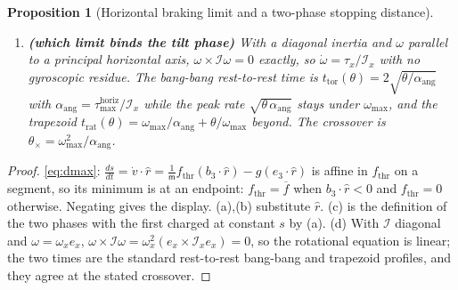 \documentclass[11pt]{article}
\theoremstyle{plain}
\newtheorem{proposition}[theorem]{Proposition}
\theoremstyle{definition}
\theoremstyle{remark}
\newcommand{\mass}{\mathsf m}
\newcommand{\inertia}{\mathcal I}
\begin{document}
\begin{proposition}[Horizontal braking limit and a two-phase stopping distance]
\begin{enumerate}[label=(\alph*)]
\begin{equation}
  \;+\;\frac{s^2}{2\,a_{\max}(\theta)}\Big],
  \end{equation}
  a lower bound on the true stopping distance, since $a_{\max}$ does not subtract the thrust
  spent holding altitude. The two terms move oppositely in $\theta$, so the minimiser is
  interior.
  \item \textbf{(which limit binds the tilt phase)} With a diagonal inertia and $\omega$ parallel
  to a principal horizontal axis, $\omega\times\inertia\omega=0$ exactly, so
  $\dot\omega=\tau_x/\inertia_x$ with no gyroscopic residue. The bang-bang rest-to-rest time is
  $t_{\mathrm{tor}}(\theta)=2\sqrt{\theta/\alpha_{\mathrm{ang}}}$ with
  $\alpha_{\mathrm{ang}}=\tau^{\mathrm{horiz}}_{\max}/\inertia_x$ while the peak rate
  $\sqrt{\theta\,\alpha_{\mathrm{ang}}}$ stays under $\omega_{\max}$, and the trapezoid
  $t_{\mathrm{rat}}(\theta)=\omega_{\max}/\alpha_{\mathrm{ang}}+\theta/\omega_{\max}$ beyond.
  The crossover is $\theta_\times=\omega_{\max}^2/\alpha_{\mathrm{ang}}$.
\end{enumerate}
\end{proposition}
\begin{proof}
\cref{eq:dmax}: $\tfrac{ds}{dt}=\dot v\cdot\hat r=\tfrac{1}{\mass}f_{\mathrm{thr}}(b_3\cdot\hat r)
-g(e_3\cdot\hat r)$ is affine in $f_{\mathrm{thr}}$ on a segment, so its minimum is at an
endpoint: $f_{\mathrm{thr}}=\overline f$ when $b_3\cdot\hat r<0$ and $f_{\mathrm{thr}}=0$
otherwise. Negating gives the display. (a),(b) substitute $\hat r$. (c) is the definition of the
two phases with the first charged at constant $s$ by (a). (d) With $\inertia$ diagonal and
$\omega=\omega_x e_x$, $\omega\times\inertia\omega=\omega_x^2(e_x\times\inertia_xe_x)=0$, so the
rotational equation is linear; the two times are the standard rest-to-rest bang-bang and
trapezoid profiles, and they agree at the stated crossover.
\end{proof}
\end{document}
